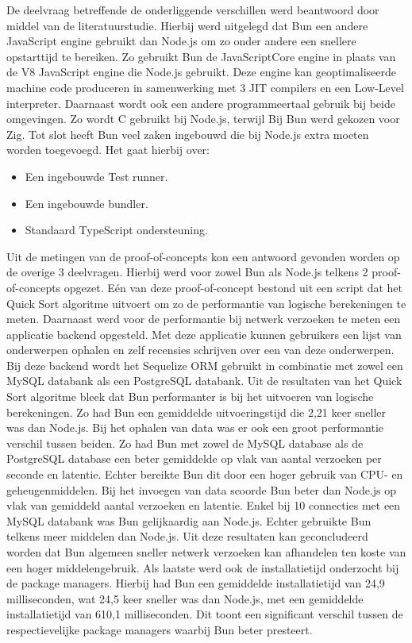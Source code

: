 De deelvraag betreffende de onderliggende verschillen werd beantwoord door middel van de literatuurstudie.
Hierbij werd uitgelegd dat Bun een andere JavaScript engine gebruikt dan Node.js om zo onder andere een snellere opstarttijd te bereiken.
Zo gebruikt Bun de JavaScriptCore engine in plaats van de V8 JavaScript engine die Node.js gebruikt.
Deze engine kan geoptimaliseerde machine code produceren in samenwerking met 3 JIT compilers en een Low-Level interpreter.
Daarnaast wordt ook een andere programmeertaal gebruik bij beide omgevingen. Zo wordt C gebruikt bij Node.js, terwijl Bij Bun werd gekozen voor Zig.
Tot slot heeft Bun veel zaken ingebouwd die bij Node.js extra moeten worden toegevoegd.
Het gaat hierbij over:
\begin{itemize}
    \item Een ingebouwde Test runner.
    \item Een ingebouwde bundler.
    \item Standaard TypeScript ondersteuning.
\end{itemize}
Uit de metingen van de proof-of-concepts kon een antwoord gevonden worden op de overige 3 deelvragen.
Hierbij werd voor zowel Bun als Node.js telkens 2 proof-of-concepts opgezet. 
Eén van deze proof-of-concept bestond uit een script dat het Quick Sort algoritme uitvoert om zo de performantie van logische berekeningen te meten.
Daarnaast werd voor de performantie bij netwerk verzoeken te meten een applicatie backend opgesteld. Met deze applicatie kunnen gebruikers
een lijst van onderwerpen ophalen en zelf recensies schrijven over een van deze onderwerpen.
Bij deze backend wordt het Sequelize ORM gebruikt in combinatie met zowel een MySQL databank als een PostgreSQL databank.
Uit de resultaten van het Quick Sort algoritme bleek dat Bun performanter is bij het uitvoeren van logische berekeningen.
Zo had Bun een gemiddelde uitvoeringstijd die 2,21 keer sneller was dan Node.js.
Bij het ophalen van data was er ook een groot performantie verschil tussen beiden. Zo had Bun met zowel de MySQL database als de PostgreSQL database 
een beter gemiddelde op vlak van aantal verzoeken per seconde en latentie. Echter bereikte Bun dit door een hoger gebruik van CPU- en geheugenmiddelen.
Bij het invoegen van data scoorde Bun beter dan Node.js op vlak van gemiddeld aantal verzoeken en latentie.
Enkel bij 10 connecties met een MySQL databank was Bun gelijkaardig aan Node.js.
Echter gebruikte Bun telkens meer middelen dan Node.js.
Uit deze resultaten kan geconcludeerd worden dat Bun algemeen sneller netwerk verzoeken kan afhandelen
ten koste van een hoger middelengebruik.
Als laatste werd ook de installatietijd onderzocht bij de package managers. Hierbij had Bun een 
gemiddelde installatietijd van 24,9 milliseconden, wat 24,5 keer sneller was dan Node.js, met een gemiddelde installatietijd van 610,1 milliseconden.
Dit toont een significant verschil tussen de respectievelijke package managers waarbij Bun beter presteert.

